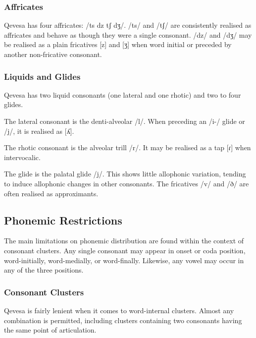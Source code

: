 \documentclass[grammar]{subfiles}
\begin{document}
\subsubsection{Affricates}
\label{sssec:affricates}

Qevesa has four affricates: /ts dz tʃ dʒ/.  /ts/ and /tʃ/ are consistently
realised as affricates and behave as though they were a single consonant.  /dz/
and /dʒ/ may be realised as a plain fricatives [z] and [ʒ] when word initial or
preceded by another non-fricative consonant.


\subsubsection{Liquids and Glides}
\label{sssec:liquids}

Qevesa has two liquid consonants (one lateral and one rhotic) and two to four
glides.

The lateral consonant is the denti-alveolar /l/.  When preceding an /i-/ glide
or /j/, it is realised as [ʎ].  %

The rhotic consonant is the alveolar trill /r/.  It may be realised as a tap
[ɾ] when intervocalic.  

The glide is the palatal glide /j/.  This shows little allophonic variation,
tending to induce allophonic changes in other consonants.  The fricatives /v/
and /ð/ are often realised as approximants.  

\subsection{Phonemic Restrictions}
\label{ssec:phonemic_restrictions}

The main limitations on phonemic distribution are found within the context of
consonant clusters.  Any single consonant may appear in onset or coda position,
word-initially, word-medially, or word-finally.  Likewise, any vowel may occur
in any of the three positions. 

\subsubsection{Consonant Clusters}
\label{sssec:consonant_clusters}

Qevesa is fairly lenient when it comes to word-internal clusters.  Almost any
combination is permitted, including clusters containing two consonants having
the same point of articulation. 
\end{document}
